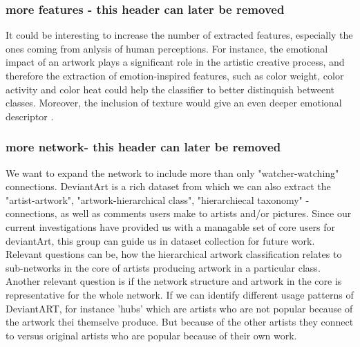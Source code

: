 
\subsubsection{more features - this header can later be removed}
It could be interesting to increase the number of extracted features, especially the ones coming from anlysis of human perceptions.
For instance, the emotional impact of an artwork plays a significant role in the artistic creative process, and therefore the extraction of emotion-inspired features, such as color weight, color activity and color heat \cite{color_emotion1} could help the classifier to better distinquish betweent classes. Moreover, the inclusion of texture would give an even deeper emotional descriptor \cite{LucassenECCGIV2010}. 
\subsubsection{more network- this header can later be removed}
We want to expand the network to include more than only "watcher-watching" connections. DeviantArt is a rich dataset from which we can also extract the "artist-artwork", "artwork-hierarchical class", "hierarchiecal taxonomy" -connections, as well as comments users make to artists and/or pictures. 
Since our current investigations have provided us with a managable set of core users for deviantArt, this group can guide us in dataset collection for future work. Relevant questions can be, how the hierarchical artwork classification relates to sub-networks in the core of artists producing artwork in a particular class. Another relevant question is if the network structure and artwork in the core is representative for the whole network. If we can identify different usage patterns of DeviantART, for instance 'hubs' which are artists who are not popular because of the artwork thei themselve produce. But because of the other artists they connect to versus original artists who are popular because of their own work.

 
